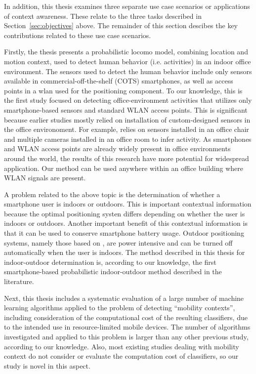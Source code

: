 In addition, this thesis examines three separate use case scenarios or applications of context awareness. These relate to the three tasks described in Section~\ref{sec:objectives} above. The remainder of this section descibes the key contributions related to these use case scenarios.

Firstly, the thesis presents a probabilistic \gls{locomo} model, combining location and motion context, used to detect human behavior (i.e. activities) in an indoor office environment. The sensors used to detect the human behavior include only sensors available in commercial-off-the-shelf (COTS) smartphones, as well as access points in a \gls{wlan} used for the positioning component. To our knowledge, this is the first study focused on detecting office-environment activities that utilizes only smartphone-based sensors and standard WLAN access points. This is significant because earlier studies mostly relied on installation of custom-designed sensors in the office environoment. For example, \cite{Manabe2010} relies on sensors installed in an office chair and multiple cameras installed in an office room to infer activity. As smartphones and WLAN access points are already widely present in office environments around the world, the results of this research have more potential for widespread application. Our method can be used anywhere within an office building where WLAN signals are present.

A problem related to the above topic is the determination of whether a smartphone user is indoors or outdoors. This is important contextual information because the optimal positioning systen differs depending on whether the user is indoors or outdoors. Another important benefit of this contextual information is that it can be used to conserve smartphone battery usage. Outdoor positioning systems, namely those based on , are power intensive and can be turned off automatically when the user is indoors. The method described in this thesis for indoor-outdoor determination is, according to our knowledge, the first smartphone-based probabilistic indoor-outdoor method described in the literature.

Next, this thesis includes a systematic evaluation of a large number of machine learning algorithms applied to the problem of detecting ``mobility contexts'', including consideration of the computational cost of the resulting classifiers, due to the intended use in resource-limited mobile devices. The number of algorithms investigated and applied to this problem is larger than any other previous study, according to our knowledge. Also, most existing studies dealing with mobility context do not consider or evaluate the computation cost of classifiers, so our study is novel in this aspect.

